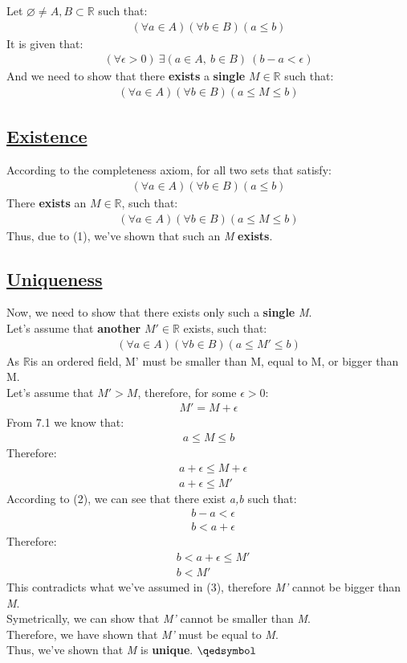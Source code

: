 \documentclass[a4paper, 12pt]{article}
\newcommand{\sub}[1]{\subsection{\underline{#1}}}
\newcommand{\R}{\ensuremath{\mathbb{R}}}
\newcommand{\eq}[1]{\begin{align*}#1\end{align*}}
\newcommand{\eqn}[1]{\begin{align}#1\end{align}}
\renewcommand{\qed}{\hfill\(\qedsymbol\)}
\begin{document}
\section{}
Let $\varnothing\neq A,B\subset\R$ such that:
\eqn{(\forall{a}\in{A})(\forall{b}\in{B})(a\leq{b})}
It is given that: \eqn{(\forall\epsilon>0)~\exists({a}\in{A},~{b}\in{B})~(b-a<\epsilon)}
And we need to show that there \textbf{exists} a \textbf{single} $M\in\R$ such that:
\eq{(\forall{a}\in{A})(\forall{b}\in{B})(a\leq{M}\leq{b})}
\sub{Existence}
According to the completeness axiom, for all two sets that satisfy:
\eq{(\forall{a}\in{A})(\forall{b}\in{B})(a\leq{b})}
There \textbf{exists} an $M\in\R$, such that:
\eq{(\forall{a}\in{A})(\forall{b}\in{B})(a\leq{M}\leq{b})}
Thus, due to (1), we've shown that such an \textit{M} \textbf{exists}.
\sub{Uniqueness}
Now, we need to show that there exists only such a \textbf{single} \textit{M}.\\
Let's assume that \textbf{another} $M'\in\R$ exists, such that:
\eqn{(\forall{a}\in{A})(\forall{b}\in{B})(a\leq{M'}\leq{b})}
As \R is an ordered field, M' must be smaller than M, equal to M, or bigger than M.\\
Let's assume that $M'>M$, therefore, for some $\epsilon>0$:
\eq{M'=M+\epsilon}
From 7.1 we know that: \eq{a\leq{M}\leq{b}}
Therefore: \eq{&a+\epsilon\leq{M+\epsilon}\\&a+\epsilon\leq{M'}}
According to (2), we can see that there exist \textit{a,b} such that:
\eq{
    &b-a<\epsilon\\
    &b<a+\epsilon
}
Therefore: \eq{
    &b<a+\epsilon\leq{M'}\\
    &b<{M'}
}
This contradicts what we've assumed in (3), therefore \textit{M'} cannot be bigger than \textit{M}.\\
Symetrically, we can show that \textit{M'} cannot be smaller than \textit{M}.\\
Therefore, we have shown that \textit{M'} must be equal to \textit{M}.\\
Thus, we've shown that \textit{M} is \textbf{unique}.
\qed

\end{document}
